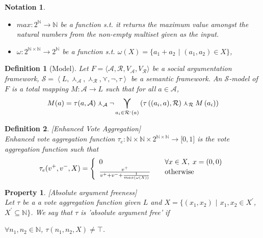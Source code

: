 \documentclass{article}
\newtheorem{definition}{Definition}
\newtheorem{property}{Property}
\newtheorem{notation}{Notation}
\newcommand{\nat}{\mathbb{N}}   %
\newcommand{\args}{\mathcal{A}} %
\newcommand{\att}{\mathcal{R}}  %
\newcommand{\valueset}{L}
\newcommand{\varg}{V_{\args}}   %
\newcommand{\vatt}{V_{\att}}   %
\newcommand{\attackers}[1]{\att^\text{-}\left(#1\right)}
\newcommand{\safid}{F}               %
\newcommand{\saf}{\safid = \safbody} %
\newcommand{\safbody}{\langle \args, \att, \varg, \vatt \rangle} %
\newcommand{\semid}{\mathcal{S}}        %
\newcommand{\sembodyNew}{\left\langle \valueset,\SAFand_\mathcal{A}, \SAFand_\mathcal{R},\SAFor,\lnot,\tau \right\rangle} %
\newcommand{\SAFand}{\curlywedge}     %
\newcommand{\SAFor}{\curlyvee}        %
\DeclareMathOperator*{\SAFOr}{\bigcurlyvee} %
\newcommand{\sem}{\mathcal{S}}
\begin{document}
\begin{notation}
\begin{itemize}
\item $max: 2^{\nat} \to \nat$ be a function s.t. it returns the maximum value amongst the natural numbers from the non-empty multiset given as the input.

\item $\omega:  2^{\nat \times \nat} \to 2^{\nat}$ be a function s.t. $\omega(X) = \{a_{1}+a_{2}$ $|$ $(a_{1}, a_{2}) \in X\}$,

\end{itemize}
\end{notation}

\begin{definition}[Model] 
\label{def:model}
  Let $\saf$ be a social argumentation framework, $\sem = \sembodyNew$ be a semantic framework. An $\semid$-model of $\safid$ is a total mapping $M : \args \rightarrow \valueset$ such that for all $a \in \args$,
  $$\displaystyle M(a) = \tau(a, \args ) \SAFand_\args \lnot \SAFOr_{a_i \in \attackers{a}} \left(\tau\left((a_i, a), \att \right) \SAFand_\att M\left(a_i\right)\right)$$
\end{definition}


\begin{definition}
\label{def:enhVoteAgg}
[Enhanced Vote Aggregation]
\\ Enhanced vote aggregation function
$\tau_{e}:\nat \times \nat \times {2}^{\nat \times \nat} \rightarrow\lbrack0,1]$ is the vote aggregation function such that
\[
\tau_{e}  (v^{+},v^{-}, X)  = \left\{
\begin{array}
[c]{lll}
0 &  & \forall x \in X,\hspace{1mm} x = (0,0)\\
\frac{v^{+}}{v^{+}+v^{-}+\frac{1}{max(\omega(X))}} &  & \text{otherwise}%
\end{array}
\right.
\]
\end{definition}


\begin{property}
\label{P1} [Absolute argument freeness] \\
Let $\tau$ be a a vote aggregation function given $\valueset$ and $X = \{(x_{1}, x_{2})$ $|$ $x_{1}, x_{2} \in X^{'}$, $X^{'} \subseteq \nat \}$. We say that $\tau$ is 'absolute argument free' if
\begin{center}
$\forall n_1, n_2 \in \nat$, $\tau (n_1, n_2, X) \neq \top$.
\end{center}
\end{property}

\end{document}
